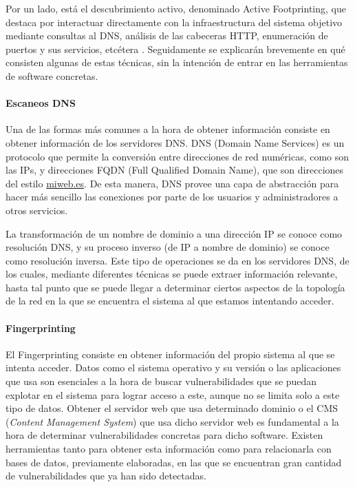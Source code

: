 Por un lado, está el descubrimiento activo, denominado Active Footprinting, que destaca por interactuar directamente con la infraestructura del sistema objetivo mediante consultas al DNS, análisis de las cabeceras HTTP, enumeración de puertos y sus servicios, etcétera \cite{pentesting-kali}. Seguidamente se explicarán brevemente en qué consisten algunas de estas técnicas, sin la intención de entrar en las herramientas de software concretas.

\paragraph{Escaneos DNS}

Una de las formas más comunes a la hora de obtener información consiste en obtener información de los servidores DNS. DNS (Domain Name Services) es un protocolo que permite la conversión entre direcciones de red numéricas, como son las IPs, y direcciones FQDN (Full Qualified Domain Name), que son direcciones del estilo \url{miweb.es}. De esta manera, DNS provee una capa de abstracción para hacer más sencillo las conexiones por parte de los usuarios y administradores a otros servicios.

La transformación de un nombre de dominio a una dirección IP se conoce como resolución DNS, y su proceso inverso (de IP a nombre de dominio) se conoce como resolución inversa. Este tipo de operaciones se da en los servidores DNS, de los cuales, mediante diferentes técnicas se puede extraer información relevante, hasta tal punto que se puede llegar a determinar ciertos aspectos de la topología de la red en la que se encuentra el sistema al que estamos intentando acceder.

\paragraph{Fingerprinting}

El Fingerprinting consiste en obtener información del propio sistema al que se intenta acceder. Datos como el sistema operativo y su versión o las aplicaciones que usa son esenciales a la hora de buscar vulnerabilidades que se puedan explotar en el sistema para lograr acceso a este, aunque no se limita solo a este tipo de datos. Obtener el servidor web que usa determinado dominio o el CMS (\textit{Content Management System}) que usa dicho servidor web es fundamental a la hora de determinar vulnerabilidades concretas para dicho software. Existen herramientas tanto para obtener esta información como para relacionarla con bases de datos, previamente elaboradas, en las que se encuentran gran cantidad de vulnerabilidades que ya han sido detectadas.

